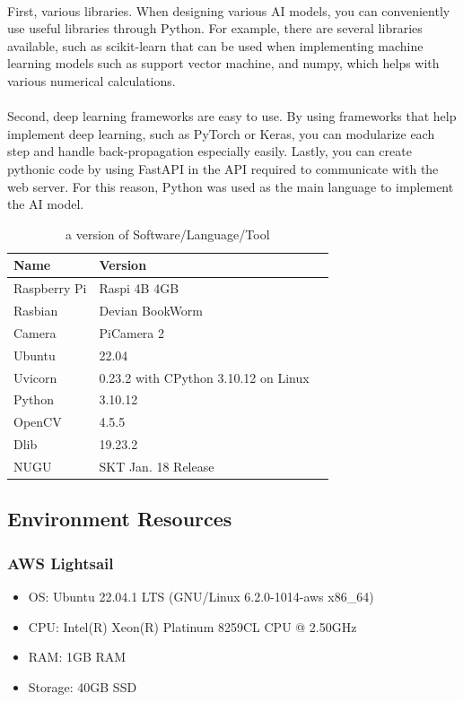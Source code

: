 \\
First, various libraries. When designing various AI models, you can conveniently use useful libraries through Python. For example, there are several libraries available, such as scikit-learn that can be used when implementing machine learning models such as support vector machine, and numpy, which helps with various numerical calculations.
\\

\\
Second, deep learning frameworks are easy to use. By using frameworks that help implement deep learning, such as PyTorch or Keras, you can modularize each step and handle back-propagation especially easily. Lastly, you can create pythonic code by using FastAPI in the API required to communicate with the web server. For this reason, Python was used as the main language to implement the AI model.\\




\begin{table}[h]
    \caption{a version of Software/Language/Tool}
    \begin{tabular}{|p{2.6cm}|p{1.7cm}|p{3.4cm}|}
    \hline
    Name & Version \\ \hline
      Raspberry Pi & Raspi 4B 4GB \\ \hline
      Rasbian & Devian BookWorm \\ \hline
      Camera & PiCamera 2\\ \hline
      Ubuntu & 22.04\\ \hline
      Uvicorn & 0.23.2 with CPython 3.10.12 on Linux\\ \hline
      Python & 3.10.12 \\ \hline
      OpenCV & 4.5.5 \\ \hline
      Dlib & 19.23.2 \\ \hline
      NUGU & SKT Jan. 18 Release \\ \hline
      
    \end{tabular}
    \end{table}


\subsection{\textbf{Environment Resources}}
\subsubsection{\textbf{AWS Lightsail}}
\begin{itemize}
    \item OS: Ubuntu 22.04.1 LTS (GNU/Linux 6.2.0-1014-aws x86\_64)
    \item CPU: Intel(R) Xeon(R) Platinum 8259CL CPU @ 2.50GHz
    \item RAM: 1GB RAM
    \item Storage: 40GB SSD
\end{itemize}
